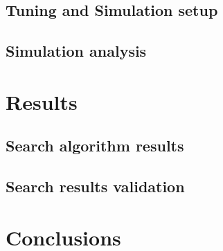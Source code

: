 \documentclass[pdflatex,sn-basic]{sn-jnl}
\begin{document}
	\subsection{Tuning and Simulation setup}
	

	\subsection{Simulation analysis}
	

\section{Results}
	\subsection{Search algorithm results}
	

	\subsection{Search results validation}
	

	

\section{Conclusions}





\end{document}
